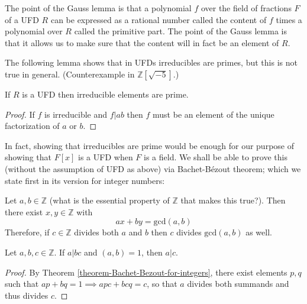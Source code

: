 The point of the Gauss lemma is that a polynomial $f$ over the field of fractions
$F$ of a UFD $R$ can be expressed as a rational number called the content of $f$
times a polynomial over $R$ called the primitive part. The point of the Gauss
lemma is that it allows us to make sure that the content will in fact be an
element of $R$.

\medskip\noindent
The following lemma shows that in UFDs irreducibles are primes, but this is not
true in general. (Counterexample in $\mathbb{Z}[\sqrt{-5}]$.)

\begin{lemma}
\label{lemma-irreducible-is-prime}
If $R$ is a UFD then irreducible elements are prime.
\end{lemma}

\begin{proof}
If $f$ is irreducible and $f|ab$ then $f$ must be an element of the unique
factorization of $a$ or $b$.
\end{proof}

In fact, showing that irreducibles are prime would be enough for our purpose of
showing that $F[x]$ is a UFD when $F$ is a field. We shall be able to prove this
(without the assumption of UFD as above) via Bachet-Bézout theorem; which we
state first in its version for integer numbers:

\begin{theorem}
\label{theorem-Bachet-Bezout-for-integers}
\begin{reference}
\cite[Theorem 1.7]{MMST}
\end{reference}
Let $a,b \in \mathbb{Z}$ (what is the essential property of $\mathbb{Z}$ that
makes this true?). Then
there exist $x,y \in \mathbb{Z}$ with
 $$
ax+by=\text{gcd}(a,b)
$$
Therefore, if $c \in \mathbb{Z}$ divides both $a$ and $b$ then $c$ divides
$\text{gcd}(a,b)$ as well.
\end{theorem}

\begin{lemma}
\label{lemma-relatively-prime-and-divides-implies-divides}
Let $a,b,c \in \mathbb{Z}$. If $a|bc$ and $(a,b)=1$, then $a|c$.
\end{lemma}

\begin{proof}
By Theorem \ref{theorem-Bachet-Bezout-for-integers}, 
there exist elements $p,q$ such
that $ap+bq=1\implies apc+bcq=c$, so that $a$ divides both summands and thus
divides $c$.
\end{proof}

